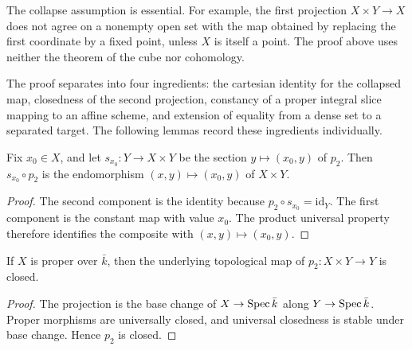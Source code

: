 \begin{remark}
  \label{rmk:rigidity_lemma_cube_free}
  The collapse assumption is essential.  For example, the first projection
  \(X\times Y\to X\) does not agree on a nonempty open set with the map obtained by
  replacing the first coordinate by a fixed point, unless \(X\) is itself a point.
  The proof above uses neither the theorem of the cube nor cohomology.
\end{remark}

\begin{remark}
  \label{rmk:rigidity_lemma_decomposition}
  The proof separates into four ingredients: the cartesian identity for the collapsed
  map, closedness of the second projection, constancy of a proper integral slice mapping
  to an affine scheme, and extension of equality from a dense set to a separated target.
  The following lemmas record these ingredients individually.
\end{remark}

\begin{lemma}
  \label{lem:rigidity_snd_lift}
  \leanok
  Fix \(x_0\in X\), and let \(s_{x_0}\colon Y\to X\times Y\) be the section
  \(y\mapsto(x_0,y)\) of \(p_2\).  Then \(s_{x_0}\circ p_2\) is the endomorphism
  \((x,y)\mapsto(x_0,y)\) of \(X\times Y\).
\end{lemma}
\begin{proof}
  \leanok
  The second component is the identity because \(p_2\circ s_{x_0}=\mathrm{id}_Y\).
  The first component is the constant map with value \(x_0\).  The product universal
  property therefore identifies the composite with \((x,y)\mapsto(x_0,y)\).
\end{proof}

\begin{lemma}
  \label{lem:snd_left_isClosedMap}
  \leanok
  If \(X\) is proper over \(\bar k\), then the underlying topological map of
  \(p_2\colon X\times Y\to Y\) is closed.
\end{lemma}
\begin{proof}
  \leanok
  The projection is the base change of \(X\to\operatorname{Spec}\bar k\) along
  \(Y\to\operatorname{Spec}\bar k\).  Proper morphisms are universally closed, and universal
  closedness is stable under base change.  Hence \(p_2\) is closed.
\end{proof}

